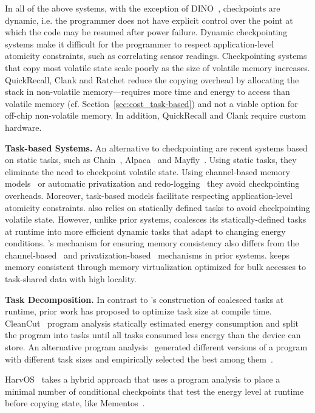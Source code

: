 In all of the above systems, with the exception of DINO~\cite{dino}, checkpoints are dynamic, i.e. the programmer does not have explicit control over the point at which the code may be resumed after power failure. Dynamic checkpointing systems make it difficult for the programmer to respect application-level atomicity constraints, such as correlating sensor readings. Checkpointing systems that copy most volatile state scale poorly as the size of volatile memory increases.  QuickRecall, Clank and Ratchet reduce the copying overhead by allocating the stack in non-volatile memory---requires more time and energy to access than volatile memory (cf. Section~\ref{sec:cost_task-based}) and not a viable option for off-chip non-volatile memory. In addition, QuickRecall and Clank require custom hardware. 

\textbf{Task-based Systems.} An alternative to checkpointing are recent systems based on static tasks, such as Chain~\cite{chain}, Alpaca~\cite{alpaca} and Mayfly~\cite{hester_sensys_2017}. Using static tasks, they eliminate the need to checkpoint volatile state. Using channel-based memory models~\cite{chain,hester_sensys_2017} or automatic privatization and redo-logging~\cite{alpaca} they avoid checkpointing overheads. Moreover, task-based models facilitate respecting application-level atomicity constraints. \sys also relies on
statically defined tasks to avoid checkpointing volatile state. However, unlike prior systems, \sys coalesces its statically-defined tasks at runtime into more efficient dynamic tasks that adapt to changing energy conditions. \sys's mechanism for ensuring memory consistency also differs from the channel-based~\cite{chain} and privatization-based~\cite{alpaca} mechanisms in prior systems. \sys keeps memory consistent through memory virtualization optimized for bulk accesses to task-shared data with high locality.

\textbf{Task Decomposition.} In contrast to \sys's construction of coalesced tasks at runtime, prior work has proposed to optimize task size at compile time. CleanCut~\cite{cleancut_2018} program analysis statically estimated energy consumption and split the program into tasks until all tasks consumed less energy than the device can store. An alternative program analysis~\cite{baghsorkhi_cgo_2018} generated different versions of a program with different task sizes and empirically selected the best among them~\cite{baghsorkhi_cgo_2018}.

HarvOS~\cite{mottola2017harvos} takes a hybrid approach that uses a program analysis to place a minimal number of conditional checkpoints that test the energy level at runtime before copying state, like Mementos~\cite{mementos}.


